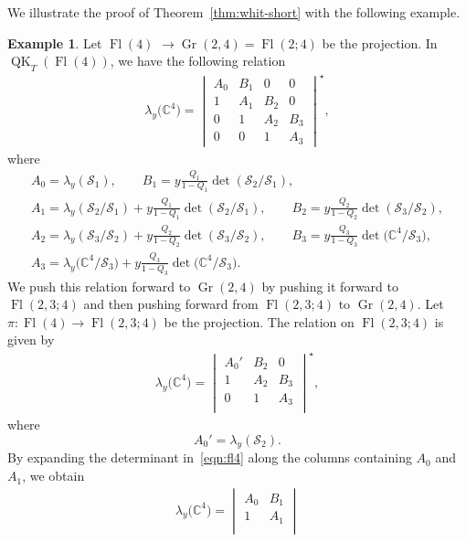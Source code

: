 \documentclass[pdftex]{sigma}
\numberwithin{equation}{section}
\theoremstyle{definition}
\newtheorem{Example}[Theorem]{Example}
\DeclareMathOperator{\Gr}{Gr}
\DeclareMathOperator{\Fl}{Fl}
\DeclareMathOperator{\QK}{QK}
\begin{document}
We illustrate the proof of Theorem~\ref{thm:whit-short} with the following example.
\begin{Example}
 Let $\Fl(4)$ $\to \Gr(2,4)=\Fl(2;4)$ be the projection. In $\QK_T(\Fl(4))$, we have the following relation
 \begin{gather}\label{eqn:fl4}
 \lambda_y\bigl(\mathbb{C}^4\bigr)=\begin{vmatrix}
 A_0 & B_1 & 0 &0 \\
 1 & A_1 &B_2 &0 \\
 0 & 1 & A_2 & B_3 \\
 0 & 0 & 1 & A_3
 \end{vmatrix}^\star,
\end{gather}
where
\begin{gather*}
A_0 = \lambda_y(\mathcal{S}_1),\qquad B_1 = y\frac{Q_1}{1-Q_1}\det(\mathcal{S}_2/{\mathcal{S}_1}),
\\
A_1= \lambda_y(\mathcal{S}_2/{\mathcal{S}_1})+y\frac{Q_1}{1-Q_1}\det(\mathcal{S}_2/{\mathcal{S}_1}) ,\qquad B_2 = y\frac{Q_2}{1-Q_2}\det(\mathcal{S}_3/{\mathcal{S}_2}),
\\
A_2 = \lambda_y(\mathcal{S}_3/{\mathcal{S}_2}) + y\frac{Q_2}{1-Q_2}\det(\mathcal{S}_3/{\mathcal{S}_2}) ,\qquad B_3 = y\frac{Q_3}{1-Q_3}\det\bigl(\mathbb{C}^4/{\mathcal{S}_3}\bigr),
\\
A_3 = \lambda_y\bigl(\mathbb{C}^4/{\mathcal{S}_3}\bigr) + y\frac{Q_3}{1-Q_3}\det\bigl(\mathbb{C}^4/{\mathcal{S}_3}\bigr).
\end{gather*}
We push this relation forward to $\Gr(2,4)$ by pushing it forward to $\Fl(2,3;4)$ and then pushing forward from $\Fl(2,3;4)$ to $\Gr(2,4)$.
Let $\pi\colon \Fl(4) \to \Fl(2,3;4)$ be the projection. The relation on $\Fl(2,3;4)$ is given by
\begin{gather}\label{eqn:234}
 \lambda_y\bigl(\mathbb{C}^4\bigr)=\begin{vmatrix}
 A_0' & B_2 & 0 \\
 1 & A_2 &B_3 \\
 0 & 1 & A_3 \\
 \end{vmatrix}^\star,
\end{gather}
where
\[
A_0' = \lambda_y(\mathcal{S}_2).
\]
By expanding the determinant in~\eqref{eqn:fl4} along the columns containing $A_0$ and $A_1$, we obtain
\begin{gather}\label{eqn:tobepushed}
 \lambda_y\bigl(\mathbb{C}^4\bigr)=\begin{vmatrix}
 A_0 & B_1 \\
 1 & A_1 \\

\end{vmatrix}
\end{gather}
\end{Example}
\end{document}

